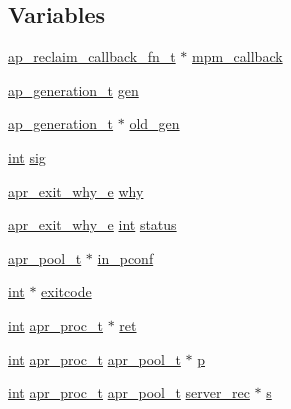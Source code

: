 \subsection*{Variables}
\begin{DoxyCompactItemize}
\item 
\hyperlink{group__APACHE__MPM_ga94be3eb6c17612b53962372f8b954837}{ap\+\_\+reclaim\+\_\+callback\+\_\+fn\+\_\+t} $\ast$ \hyperlink{group__APACHE__MPM_gab7ef6e81931222cb3b5dd887fa453bbc}{mpm\+\_\+callback}
\item 
\hyperlink{scoreboard_8h_a36af569e52dd926cc530df071af3d939}{ap\+\_\+generation\+\_\+t} \hyperlink{group__APACHE__MPM_ga37021508479f4dcebba4054a070491d8}{gen}
\item 
\hyperlink{scoreboard_8h_a36af569e52dd926cc530df071af3d939}{ap\+\_\+generation\+\_\+t} $\ast$ \hyperlink{group__APACHE__MPM_gae1fe83d6df293766f64ffd276c145e46}{old\+\_\+gen}
\item 
\hyperlink{pcre_8txt_a42dfa4ff673c82d8efe7144098fbc198}{int} \hyperlink{group__APACHE__MPM_ga68be1f65e6d1f2949835d9b6b44bcf8e}{sig}
\item 
\hyperlink{group__apr__thread__proc_gac097b4fa41e67024711c5983446d0951}{apr\+\_\+exit\+\_\+why\+\_\+e} \hyperlink{group__APACHE__MPM_gaba773639b4c166475bd195d7e1ab646f}{why}
\item 
\hyperlink{group__apr__thread__proc_gac097b4fa41e67024711c5983446d0951}{apr\+\_\+exit\+\_\+why\+\_\+e} \hyperlink{pcre_8txt_a42dfa4ff673c82d8efe7144098fbc198}{int} \hyperlink{group__APACHE__MPM_ga2a7bd29bcf8aec87d8318a902674e3fc}{status}
\item 
\hyperlink{structapr__pool__t}{apr\+\_\+pool\+\_\+t} $\ast$ \hyperlink{group__APACHE__MPM_ga9422e9b8a8d7438f893192df05fad3b8}{in\+\_\+pconf}
\item 
\hyperlink{pcre_8txt_a42dfa4ff673c82d8efe7144098fbc198}{int} $\ast$ \hyperlink{group__APACHE__MPM_gae3500b4b917090c23a483eef038d3307}{exitcode}
\item 
\hyperlink{pcre_8txt_a42dfa4ff673c82d8efe7144098fbc198}{int} \hyperlink{structapr__proc__t}{apr\+\_\+proc\+\_\+t} $\ast$ \hyperlink{group__APACHE__MPM_ga794c48ec324a4d85a40f38fe264d2a41}{ret}
\item 
\hyperlink{pcre_8txt_a42dfa4ff673c82d8efe7144098fbc198}{int} \hyperlink{structapr__proc__t}{apr\+\_\+proc\+\_\+t} \hyperlink{structapr__pool__t}{apr\+\_\+pool\+\_\+t} $\ast$ \hyperlink{group__APACHE__MPM_gabd80486ee9d7a4c2453d2c6e8a4f0f44}{p}
\item 
\hyperlink{pcre_8txt_a42dfa4ff673c82d8efe7144098fbc198}{int} \hyperlink{structapr__proc__t}{apr\+\_\+proc\+\_\+t} \hyperlink{structapr__pool__t}{apr\+\_\+pool\+\_\+t} \hyperlink{structserver__rec}{server\+\_\+rec} $\ast$ \hyperlink{group__APACHE__MPM_ga308e2624c5ce3e894cd21376821e51ae}{s}

\end{DoxyCompactItemize}
